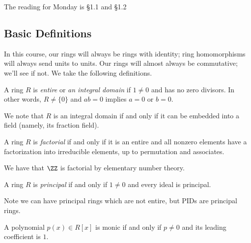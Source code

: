 The reading for Monday is \S1.1 and \S1.2

\subsection{Basic Definitions}
In this course, our rings will always be rings with identity; ring homomorphisms will always send units to units. Our rings will almost always be commutative; we'll see if not. We take the following definitions.
\begin{defi}
    A ring $R$ is \textit{entire} or \textit{an integral domain} if $1\ne0$ and has no zero divisors. In other words, $R\ne\{0\}$ and $ab=0$ implies $a=0$ or $b=0.$
\end{defi}
We note that $R$ is an integral domain if and only if it can be embedded into a field (namely, its fraction field).
\begin{defi}
    A ring $R$ is \textit{factorial} if and only if it is an entire and all nonzero elements have a factorization into irreducible elements, up to permutation and associates.
\end{defi}
\begin{ex}
    We have that $\ZZ$ is factorial by elementary number theory.
\end{ex}
\begin{defi}[Principal]
    A ring $R$ is \textit{principal} if and only if $1\ne0$ and every ideal is principal.
\end{defi}
Note we can have principal rings which are not entire, but PIDs are principal rings.
\begin{defi}
    A polynomial $p(x)\in R[x]$ is monic if and only if $p\ne0$ and its leading coefficient is $1.$
\end{defi}

